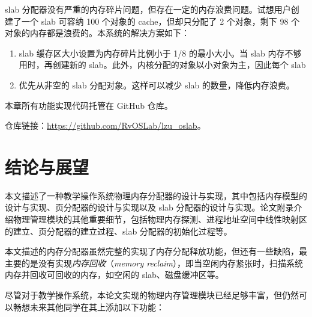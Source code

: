 \documentclass[AutoFakeBold]{LZUThesis}
\begin{document}
\begin{sloppypar}
slab
分配器没有严重的内存碎片问题，但存在一定的内存浪费问题。试想用户创建了一个
slab 可容纳 100 个对象的 cache，但却只分配了 2 个对象，剩下 98
个对象的内存都是浪费的。本系统的解决方案如下：

\begin{enumerate}
\def\labelenumi{\arabic{enumi}.}
\item
  slab 缓存区大小设置为内存碎片比例小于 1/8 的最小大小。当 slab
  内存不够用时，再创建新的
  slab。此外，内核分配的对象以小对象为主，因此每个 slab
\item
  优先从非空的 slab 分配对象。这样可以减少 slab 的数量，降低内存浪费。
\end{enumerate}

本章所有功能实现代码托管在 GitHub 仓库。

仓库链接：\href{https://github.com/RvOSLab/lzu_oslab}{https://github.com/RvOSLab/lzu\_oslab}。

\chapter{结论与展望}

本文描述了一种教学操作系统物理内存分配器的设计与实现，其中包括内存模型的设计与实现、页分配器的设计与实现以及
slab
分配器的设计与实现。论文附录介绍物理管理模块的其他重要细节，包括物理内存探测、进程地址空间中线性映射区的建立、页分配器的建立过程、slab
分配器的初始化过程等。

本文描述的内存分配器虽然完整的实现了内存分配释放功能，但还有一些缺陷，最主要的是没有实现\emph{内存回收}（\emph{memory
reclaim}），即当空闲内存紧张时，扫描系统内存并回收可回收的内存，如空闲的
slab、磁盘缓冲区等。

尽管对于教学操作系统，本论文实现的物理内存管理模块已经足够丰富，但仍然可以畅想未来其他同学在其上添加以下功能：


\end{sloppypar}
\end{document}
